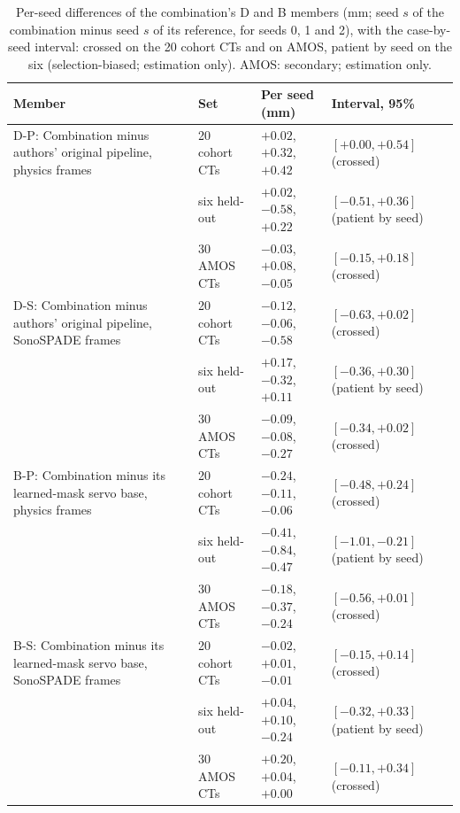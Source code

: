 
\begin{table}[tp]
\renewcommand{\baselinestretch}{1}\scriptsize
\caption{Per-seed differences of the combination's D and B members (mm; seed $s$ of the combination minus seed $s$ of its reference, for seeds 0, 1 and 2), with the case-by-seed interval: crossed on the 20 cohort CTs and on AMOS, patient by seed on the six (selection-biased; estimation only). AMOS: secondary; estimation only.}
\label{tab:s11-combination-seeds}
\centering
\setlength{\tabcolsep}{3pt}
\begin{tabularx}{\textwidth}{@{}>{\raggedright\arraybackslash}X l l l@{}}
\toprule
Member & Set & Per seed (mm) & Interval, 95\% \\
\midrule
\quad D-P: Combination minus authors' original pipeline, physics frames & 20 cohort CTs & $+0.02$, $+0.32$, $+0.42$ & $[+0.00, +0.54]$ (crossed) \\
\quad\quad & six held-out & $+0.02$, $-0.58$, $+0.22$ & $[-0.51, +0.36]$ (patient by seed) \\
\quad\quad & 30 AMOS CTs & $-0.03$, $+0.08$, $-0.05$ & $[-0.15, +0.18]$ (crossed) \\
\quad D-S: Combination minus authors' original pipeline, SonoSPADE frames & 20 cohort CTs & $-0.12$, $-0.06$, $-0.58$ & $[-0.63, +0.02]$ (crossed) \\
\quad\quad & six held-out & $+0.17$, $-0.32$, $+0.11$ & $[-0.36, +0.30]$ (patient by seed) \\
\quad\quad & 30 AMOS CTs & $-0.09$, $-0.08$, $-0.27$ & $[-0.34, +0.02]$ (crossed) \\
\quad B-P: Combination minus its learned-mask servo base, physics frames & 20 cohort CTs & $-0.24$, $-0.11$, $-0.06$ & $[-0.48, +0.24]$ (crossed) \\
\quad\quad & six held-out & $-0.41$, $-0.84$, $-0.47$ & $[-1.01, -0.21]$ (patient by seed) \\
\quad\quad & 30 AMOS CTs & $-0.18$, $-0.37$, $-0.24$ & $[-0.56, +0.01]$ (crossed) \\
\quad B-S: Combination minus its learned-mask servo base, SonoSPADE frames & 20 cohort CTs & $-0.02$, $+0.01$, $-0.01$ & $[-0.15, +0.14]$ (crossed) \\
\quad\quad & six held-out & $+0.04$, $+0.10$, $-0.24$ & $[-0.32, +0.33]$ (patient by seed) \\
\quad\quad & 30 AMOS CTs & $+0.20$, $+0.04$, $+0.00$ & $[-0.11, +0.34]$ (crossed) \\
\bottomrule
\end{tabularx}
\end{table}
